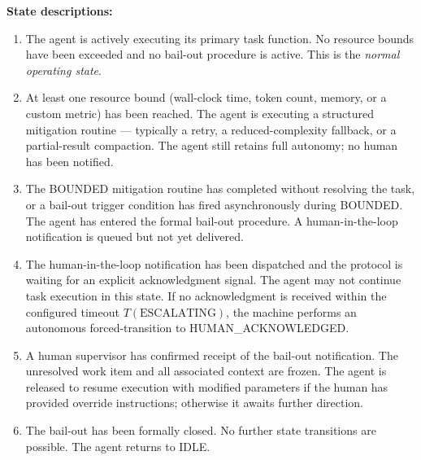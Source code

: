 \bigskip
\noindent\textbf{State descriptions:}

\begin{enumerate}

  \item[\textbf{IDLE}] \label{state:IDLE}
        The agent is actively executing its primary task function.  No
        resource bounds have been exceeded and no bail-out procedure is
        active.  This is the \emph{normal operating state}.

  \item[\textbf{BOUNDED}] \label{state:BOUNDED}
        At least one resource bound (wall-clock time, token count, memory, or
        a custom metric) has been reached.  The agent is executing a
        structured mitigation routine --- typically a retry, a reduced-complexity
        fallback, or a partial-result compaction.  The agent still retains
        full autonomy; no human has been notified.

  \item[\textbf{BAIL\_PENDING}] \label{state:BAIL_PENDING}
        The BOUNDED mitigation routine has completed without resolving the
        task, or a bail-out trigger condition has fired asynchronously during
        BOUNDED.  The agent has entered the formal bail-out procedure.
        A human-in-the-loop notification is queued but not yet delivered.

  \item[\textbf{ESCALATING}] \label{state:ESCALATING}
        The human-in-the-loop notification has been dispatched and the
        protocol is waiting for an explicit acknowledgment signal.
        The agent may not continue task execution in this state.
        If no acknowledgment is received within the configured timeout
        $T(\text{ESCALATING})$, the machine performs an autonomous
        forced-transition to HUMAN\_ACKNOWLEDGED.

  \item[\textbf{HUMAN\_ACKNOWLEDGED}] \label{state:HUMAN_ACKNOWLEDGED}
        A human supervisor has confirmed receipt of the bail-out notification.
        The unresolved work item and all associated context are frozen.
        The agent is released to resume execution with modified parameters
        if the human has provided override instructions; otherwise it
        awaits further direction.

  \item[\textbf{RESOLVED}] \label{state:RESOLVED}
        The bail-out has been formally closed.  No further state transitions
        are possible.  The agent returns to IDLE.

\end{enumerate}

